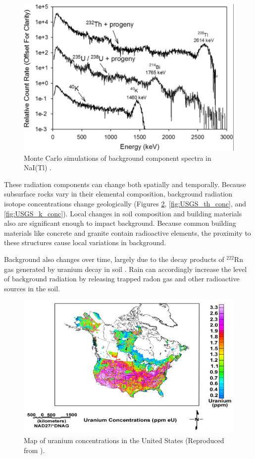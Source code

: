 \begin{figure}[H]
\centering
\includegraphics[width=0.8\linewidth]{images/background_components}
\caption{Monte Carlo simulations of background component spectra in NaI(Tl) \cite{KULISEK2015}.}
\label{fig:background_components}
\end{figure}

These radiation components can change both spatially and temporally. Because subsurface rocks vary in their elemental composition, background radiation isotope concentrations change geologically (Figures \ref{fig:USGS_u_conc}, \ref{fig:USGS_th_conc}, and \ref{fig:USGS_k_conc}). Local changes in soil composition and building materials also are significant enough to impact background. Because common building materials like concrete and granite contain radioactive elements, the proximity to these structures cause local variations in background. 

Background also changes over time, largely due to the decay products of $^{222}$Rn gas generated by uranium decay in soil \cite{knoll}. Rain can accordingly increase the level of background radiation by releasing trapped radon gas and other radioactive sources in the soil.


\begin{figure}[H]
\centering
\includegraphics[width=0.9\linewidth]{images/USGS_u_conc}
\caption{Map of uranium concentrations in the United States (Reproduced from \cite{USGS}).}
\label{fig:USGS_u_conc}
\end{figure}

